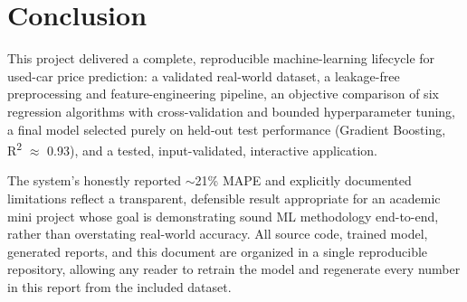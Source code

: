\documentclass[12pt,a4paper]{report}
\begin{document}
\chapter{Conclusion}

This project delivered a complete, reproducible machine-learning lifecycle
for used-car price prediction: a validated real-world dataset, a
leakage-free preprocessing and feature-engineering pipeline, an objective
comparison of six regression algorithms with cross-validation and bounded
hyperparameter tuning, a final model selected purely on held-out test
performance (Gradient Boosting, R\textsuperscript{2} $\approx$ 0.93), and
a tested, input-validated, interactive application.

The system's honestly reported $\sim$21\% MAPE and explicitly documented
limitations reflect a transparent, defensible result appropriate for an
academic mini project whose goal is demonstrating sound ML methodology
end-to-end, rather than overstating real-world accuracy. All source code,
trained model, generated reports, and this document are organized in a
single reproducible repository, allowing any reader to retrain the model
and regenerate every number in this report from the included dataset.

\end{document}
